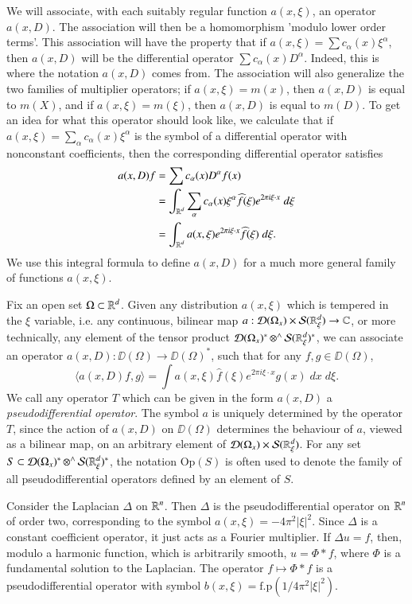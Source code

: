 We will associate, with each suitably regular function $a(x,\xi)$, an operator $a(x,D)$. The association will then be a homomorphism 'modulo lower order terms'. This association will have the property that if $a(x,\xi) = \sum c_\alpha(x) \xi^\alpha$, then $a(x,D)$ will be the differential operator $\sum c_\alpha(x) D^\alpha$. Indeed, this is where the notation $a(x,D)$ comes from. The association will also generalize the two families of multiplier operators; if $a(x,\xi) = m(x)$, then $a(x,D)$ is equal to $m(X)$, and if $a(x,\xi) = m(\xi)$, then $a(x,D)$ is equal to $m(D)$. To get an idea for what this operator should look like, we calculate that if $a(x,\xi) = \sum_\alpha c_\alpha(x) \xi^\alpha$ is the symbol of a differential operator with nonconstant coefficients, then the corresponding differential operator satisfies
%
\begin{align*}
    a(x,D) f &= \sum c_\alpha(x) D^\alpha f(x)\\
    &= \int_{\operatorname{\mathbb{R}}^d} \sum_\alpha c_\alpha(x) \xi^\alpha \widehat{f}(\xi) e^{2 \pi i \xi \cdot x}\; d\xi\\
    &= \int_{\operatorname{\mathbb{R}}^d} a(x,\xi) e^{2 \pi i \xi \cdot x} \widehat{f}(\xi)\; d\xi.
\end{align*}
%
We use this integral formula to define $a(x,D)$ for a much more general family of functions $a(x,\xi)$.

Fix an open set $\Omega \subset \operatorname{\mathbb{R}}^d$. Given any distribution $a(x,\xi)$ which is tempered in the $\xi$ variable, i.e. any continuous, bilinear map $a: \operatorname{\mathcal{D}}(\Omega_x) \times \mathcal{S}(\operatorname{\mathbb{R}}^d_\xi) \to \operatorname{\mathbb{C}}$, or more technically, any element of the tensor product $\operatorname{\mathcal{D}}(\Omega_x)^* \operatorname{{{\otimes}^\wedge}} \operatorname{\mathcal{S}}(\operatorname{\mathbb{R}}^d_\xi)^*$, we can associate an operator $a(x,D): \DD(\Omega) \to \DD(\Omega)^*$, such that for any $f,g \in \DD(\Omega)$,
%
\[ \langle a(x,D) f, g \rangle = \int a(x,\xi) \widehat{f}(\xi) e^{2 \pi i \xi \cdot x} g(x)\; dx\; d\xi. \]
%
We call any operator $T$ which can be given in the form $a(x,D)$ a \emph{pseudodifferential operator}. The symbol $a$ is uniquely determined by the operator $T$, since the action of $a(x,D)$ on $\DD(\Omega)$ determines the behaviour of $a$, viewed as a bilinear map, on an arbitrary element of $\operatorname{\mathcal{D}}(\Omega_x) \times \operatorname{\mathcal{S}}(\operatorname{\mathbb{R}}^d_\xi)$. For any set $S \subset \operatorname{\mathcal{D}}(\Omega_x)^* \operatorname{{{\otimes}^\wedge}} \operatorname{\mathcal{S}}(\operatorname{\mathbb{R}}^d_\xi)^*$, the notation $\text{Op}(S)$ is often used to denote the family of all pseudodifferential operators defined by an element of $S$.

\begin{example}
    Consider the Laplacian $\Delta$ on $\operatorname{\mathbb{R}}^n$. Then $\Delta$ is the pseudodifferential operator on $\operatorname{\mathbb{R}}^n$ of order two, corresponding to the symbol $a(x,\xi) = - 4\pi^2 |\xi|^2$. Since $\Delta$ is a constant coefficient operator, it just acts as a Fourier multiplier. If $\Delta u = f$, then, modulo a harmonic function, which is arbitrarily smooth, $u = \Phi * f$, where $\Phi$ is a fundamental solution to the Laplacian. The operator $f \mapsto \Phi * f$ is a pseudodifferential operator with symbol $b(x,\xi) = \text{f.p}(1/4\pi^2 |\xi|^2)$. 
\end{example}

